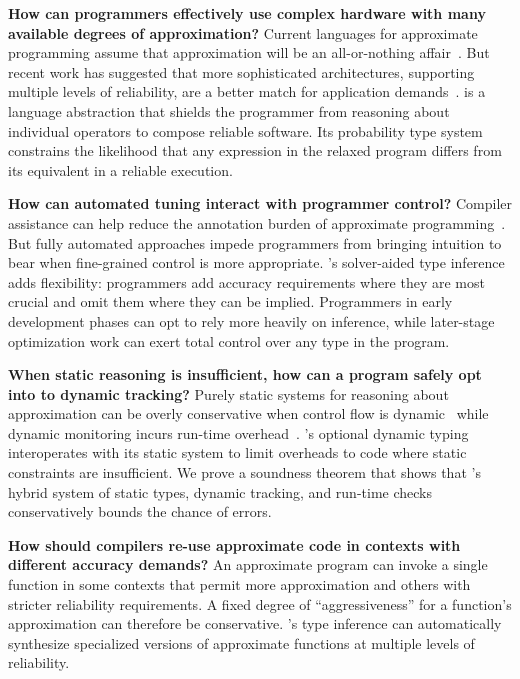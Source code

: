 {\textbf{How can programmers effectively use complex hardware with many
available degrees of approximation?}
Current languages for approximate programming assume that approximation
will be an all-or-nothing affair~\cite{enerj, rely, chisel}.
But recent work has suggested that more sophisticated architectures,
supporting
multiple levels of reliability, are a better match for
application demands~\cite{quora}.
\lang is a language abstraction that shields the programmer from reasoning
about individual operators to compose reliable software.
Its probability type system constrains the likelihood that any expression in
the relaxed program differs from its equivalent in a reliable execution.

\textbf{How can automated tuning interact with programmer control?}
Compiler assistance can help reduce the annotation burden of
approximate programming~\cite{paraprox, expax-tr, chisel}.
But fully automated approaches impede programmers from bringing intuition
to bear when fine-grained control is more appropriate.
\lang's solver-aided type inference adds flexibility: programmers add
accuracy requirements where they are most crucial and omit them where they can
be implied.
Programmers in early development phases can opt to rely more heavily on
inference, while later-stage optimization work can exert total control over
any type in the program.

\textbf{When static reasoning is insufficient, how can a program safely
opt into to dynamic tracking?}
Purely static systems for reasoning about approximation can be overly
conservative when control flow is dynamic~\cite{rely} while dynamic
monitoring incurs run-time overhead~\cite{approxdebug}.
\lang's optional dynamic typing interoperates with its static system to limit
overheads to code where static constraints are insufficient.
We prove a soundness theorem that shows that \lang's hybrid system of static
types, dynamic tracking, and run-time checks conservatively bounds the chance
of errors.

\textbf{How should compilers re-use approximate code in contexts
with different accuracy demands?}
An approximate program can invoke a single function in some contexts
that permit more approximation and others with stricter reliability
requirements.
A fixed degree of ``aggressiveness'' for a function's approximation can
therefore be conservative.
\lang's type inference can automatically synthesize specialized
versions of approximate functions at multiple levels of reliability.

}
